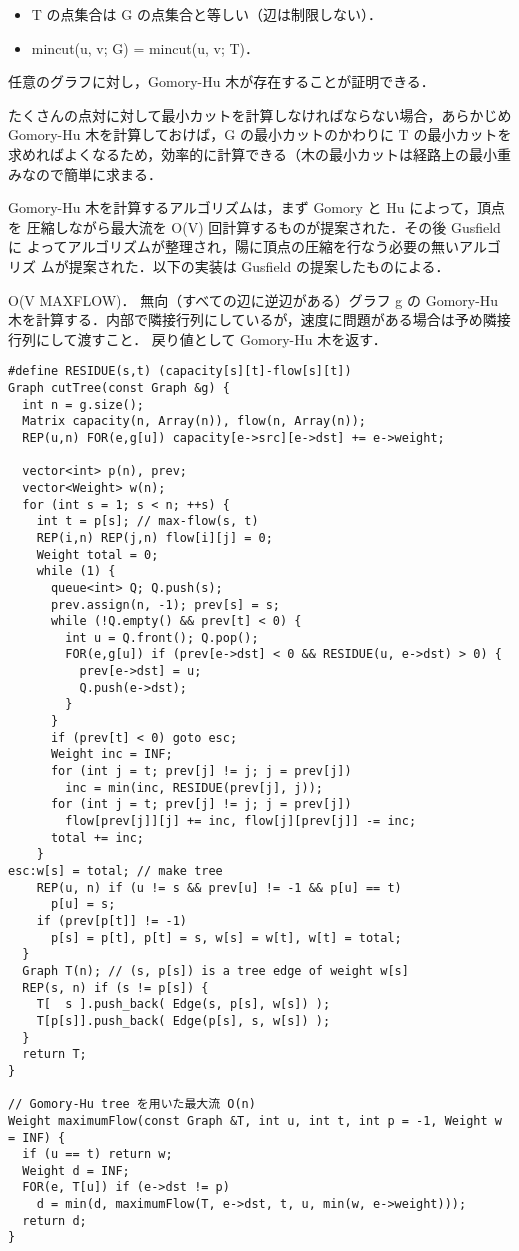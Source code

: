 \begin{itemize}
\item{T の点集合は G の点集合と等しい（辺は制限しない）．}
\item{mincut(u, v; G) = mincut(u, v; T)．}
\end{itemize}

任意のグラフに対し，Gomory-Hu 木が存在することが証明できる．

たくさんの点対に対して最小カットを計算しなければならない場合，あらかじめ Gomory-Hu 木を計算しておけば，G の最小カットのかわりに T の最小カットを求めればよくなるため，効率的に計算できる（木の最小カットは経路上の最小重みなので簡単に求まる．

Gomory-Hu 木を計算するアルゴリズムは，まず Gomory と Hu によって，頂点を
圧縮しながら最大流を O(V) 回計算するものが提案された．その後 Gusfield に
よってアルゴリズムが整理され，陽に頂点の圧縮を行なう必要の無いアルゴリズ
ムが提案された．以下の実装は Gusfield の提案したものによる．

O(V MAXFLOW)．
無向（すべての辺に逆辺がある）グラフ g の Gomory-Hu 木を計算する．内部で隣接行列にしているが，速度に問題がある場合は予め隣接行列にして渡すこと．
戻り値として Gomory-Hu 木を返す．

\begin{lstlisting}
#define RESIDUE(s,t) (capacity[s][t]-flow[s][t])
Graph cutTree(const Graph &g) {
  int n = g.size();
  Matrix capacity(n, Array(n)), flow(n, Array(n));
  REP(u,n) FOR(e,g[u]) capacity[e->src][e->dst] += e->weight;

  vector<int> p(n), prev;
  vector<Weight> w(n);
  for (int s = 1; s < n; ++s) {
    int t = p[s]; // max-flow(s, t)
    REP(i,n) REP(j,n) flow[i][j] = 0;
    Weight total = 0;
    while (1) {
      queue<int> Q; Q.push(s);
      prev.assign(n, -1); prev[s] = s;
      while (!Q.empty() && prev[t] < 0) {
        int u = Q.front(); Q.pop();
        FOR(e,g[u]) if (prev[e->dst] < 0 && RESIDUE(u, e->dst) > 0) {
          prev[e->dst] = u;
          Q.push(e->dst);
        }
      }
      if (prev[t] < 0) goto esc;
      Weight inc = INF;
      for (int j = t; prev[j] != j; j = prev[j])
        inc = min(inc, RESIDUE(prev[j], j));
      for (int j = t; prev[j] != j; j = prev[j])
        flow[prev[j]][j] += inc, flow[j][prev[j]] -= inc;
      total += inc;
    }
esc:w[s] = total; // make tree
    REP(u, n) if (u != s && prev[u] != -1 && p[u] == t)
      p[u] = s;
    if (prev[p[t]] != -1)
      p[s] = p[t], p[t] = s, w[s] = w[t], w[t] = total;
  }
  Graph T(n); // (s, p[s]) is a tree edge of weight w[s]
  REP(s, n) if (s != p[s]) {
    T[  s ].push_back( Edge(s, p[s], w[s]) );
    T[p[s]].push_back( Edge(p[s], s, w[s]) );
  }
  return T;
}

// Gomory-Hu tree を用いた最大流 O(n)
Weight maximumFlow(const Graph &T, int u, int t, int p = -1, Weight w = INF) {
  if (u == t) return w;
  Weight d = INF;
  FOR(e, T[u]) if (e->dst != p)
    d = min(d, maximumFlow(T, e->dst, t, u, min(w, e->weight)));
  return d;
}
\end{lstlisting}



